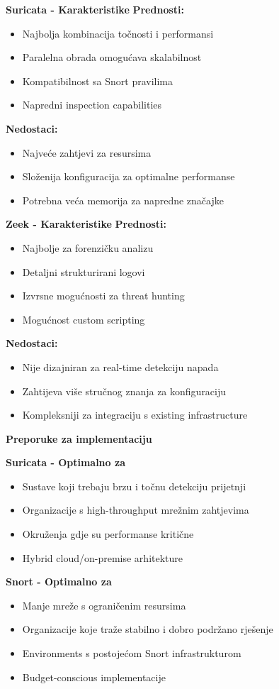 \textbf{Suricata - Karakteristike}
\textbf{Prednosti:}
\begin{itemize}
\item Najbolja kombinacija točnosti i performansi
\item Paralelna obrada omogućava skalabilnost
\item Kompatibilnost sa Snort pravilima
\item Napredni inspection capabilities
\end{itemize}

\textbf{Nedostaci:}
\begin{itemize}
\item Najveće zahtjevi za resursima
\item Složenija konfiguracija za optimalne performanse
\item Potrebna veća memorija za napredne značajke
\end{itemize}

\textbf{Zeek - Karakteristike}
\textbf{Prednosti:}
\begin{itemize}
\item Najbolje za forenzičku analizu
\item Detaljni strukturirani logovi
\item Izvrsne mogućnosti za threat hunting
\item Mogućnost custom scripting
\end{itemize}

\textbf{Nedostaci:}
\begin{itemize}
\item Nije dizajniran za real-time detekciju napada
\item Zahtijeva više stručnog znanja za konfiguraciju
\item Kompleksniji za integraciju s existing infrastructure
\end{itemize}

\textbf{Preporuke za implementaciju}

\textbf{Suricata - Optimalno za}
\begin{itemize}
\item Sustave koji trebaju brzu i točnu detekciju prijetnji
\item Organizacije s high-throughput mrežnim zahtjevima
\item Okruženja gdje su performanse kritične
\item Hybrid cloud/on-premise arhitekture
\end{itemize}

\textbf{Snort - Optimalno za}
\begin{itemize}
\item Manje mreže s ograničenim resursima
\item Organizacije koje traže stabilno i dobro podržano rješenje
\item Environments s postojećom Snort infrastrukturom
\item Budget-conscious implementacije
\end{itemize}

